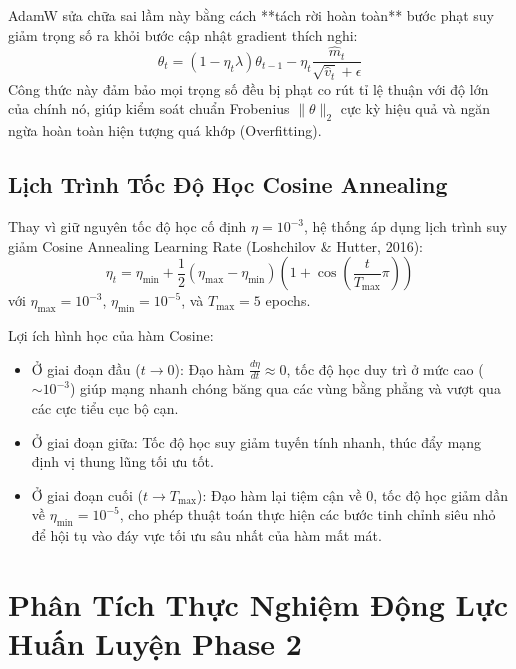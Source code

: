 \documentclass[11pt,a4paper]{report}
\begin{document}
AdamW sửa chữa sai lầm này bằng cách **tách rời hoàn toàn** bước phạt suy giảm trọng số ra khỏi bước cập nhật gradient thích nghi:
\begin{equation}
    \theta_t = (1 - \eta_t \lambda) \theta_{t-1} - \eta_t \frac{\hat{m}_t}{\sqrt{\hat{v}_t} + \epsilon}
\end{equation}
Công thức này đảm bảo mọi trọng số đều bị phạt co rút tỉ lệ thuận với độ lớn của chính nó, giúp kiểm soát chuẩn Frobenius $\|\theta\|_2$ cực kỳ hiệu quả và ngăn ngừa hoàn toàn hiện tượng quá khớp (Overfitting).

\section{Lịch Trình Tốc Độ Học Cosine Annealing}

Thay vì giữ nguyên tốc độ học cố định $\eta = 10^{-3}$, hệ thống áp dụng lịch trình suy giảm Cosine Annealing Learning Rate (Loshchilov \& Hutter, 2016):
\begin{equation}
    \eta_t = \eta_{\min} + \frac{1}{2}(\eta_{\max} - \eta_{\min}) \left( 1 + \cos\left( \frac{t}{T_{\max}} \pi \right) \right)
\end{equation}
với $\eta_{\max} = 10^{-3}$, $\eta_{\min} = 10^{-5}$, và $T_{\max} = 5$ epochs.

Lợi ích hình học của hàm Cosine:
\begin{itemize}
    \item Ở giai đoạn đầu ($t \to 0$): Đạo hàm $\frac{d\eta}{dt} \approx 0$, tốc độ học duy trì ở mức cao ($\sim 10^{-3}$) giúp mạng nhanh chóng băng qua các vùng bằng phẳng và vượt qua các cực tiểu cục bộ cạn.
    \item Ở giai đoạn giữa: Tốc độ học suy giảm tuyến tính nhanh, thúc đẩy mạng định vị thung lũng tối ưu tốt.
    \item Ở giai đoạn cuối ($t \to T_{\max}$): Đạo hàm lại tiệm cận về 0, tốc độ học giảm dần về $\eta_{\min} = 10^{-5}$, cho phép thuật toán thực hiện các bước tinh chỉnh siêu nhỏ để hội tụ vào đáy vực tối ưu sâu nhất của hàm mất mát.
\end{itemize}

\chapter{Phân Tích Thực Nghiệm Động Lực Huấn Luyện Phase 2}
\end{document}

